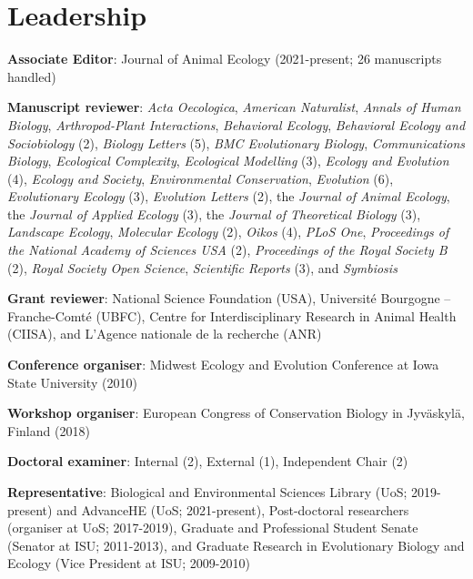 \documentclass[letterpaper]{article}
\renewenvironment{itemize}{
  \begin{list}{}{
    \setlength{\leftmargin}{1.5em}
  }
}{
  \end{list}
}
\begin{document}
\section*{Leadership}
\begin{itemize}
\item {\bf Associate Editor}: Journal of Animal Ecology (2021-present; 26 manuscripts handled)
\item {\bf Manuscript reviewer}: {\it Acta Oecologica}, {\it American Naturalist}, {\it Annals of Human Biology}, {\it Arthropod-Plant Interactions}, {\it Behavioral Ecology}, {\it Behavioral Ecology and Sociobiology} (2), {\it Biology Letters} (5), {\it BMC Evolutionary Biology}, {\it Communications Biology}, {\it Ecological Complexity}, {\it Ecological Modelling} (3), {\it Ecology and Evolution} (4), {\it Ecology and Society}, {\it Environmental Conservation}, {\it Evolution} (6), {\it Evolutionary Ecology} (3), {\it Evolution Letters} (2), the {\it Journal of Animal Ecology}, the {\it Journal of Applied Ecology} (3), the {\it Journal of Theoretical Biology} (3), {\it Landscape Ecology}, {\it Molecular Ecology} (2), {\it Oikos} (4), {\it PLoS One}, {\it Proceedings of the National Academy of Sciences USA} (2), {\it Proceedings of the Royal Society B} (2), {\it Royal Society Open Science}, {\it Scientific Reports} (3), and {\it Symbiosis}
\item {\bf Grant reviewer}: National Science Foundation (USA), Universit\'{e} Bourgogne -- Franche-Comt\'{e} (UBFC), Centre for Interdisciplinary Research in Animal Health (CIISA), and L'Agence nationale de la recherche (ANR)
\item {\bf Conference organiser}: Midwest Ecology and Evolution Conference at Iowa State University (2010)
\item {\bf Workshop organiser}: European Congress of Conservation Biology in Jyv\"{a}skyl\"{a}, Finland (2018)
\item {\bf Doctoral examiner}: Internal (2), External (1), Independent Chair (2)
\item {\bf Representative}: Biological and Environmental Sciences Library (UoS; 2019-present) and AdvanceHE (UoS; 2021-present), Post-doctoral researchers (organiser at UoS; 2017-2019), Graduate and Professional Student Senate (Senator at ISU; 2011-2013), and Graduate Research in Evolutionary Biology and Ecology (Vice President at ISU; 2009-2010)
\end{itemize}
\end{document}
